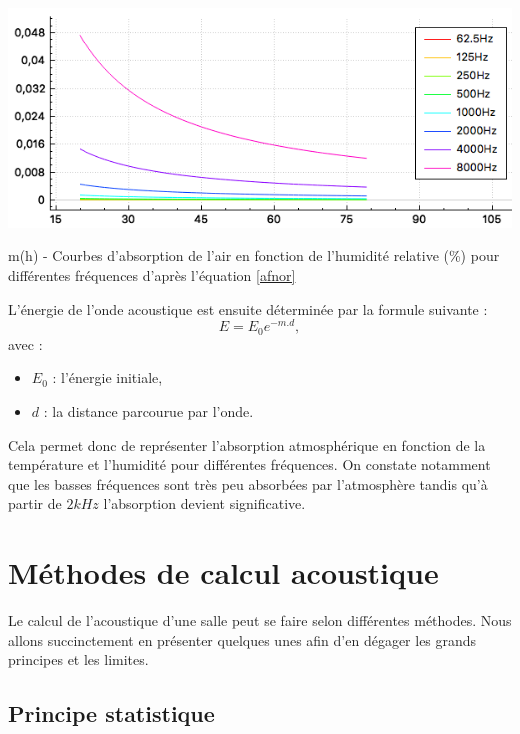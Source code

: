 \begin{figureth}
	\includegraphics[width=0.8\linewidth]{images/absorptionter}
	\caption{m(h) - Courbes d'absorption de l'air en fonction de l'humidité relative (\%) pour différentes fréquences d'après l'équation \ref{afnor}}
	\label{absorptionter}
\end{figureth}

L'énergie de l'onde acoustique est ensuite déterminée par la formule suivante :
\begin{equation} \label{energie_absAir}
	E = E_0 e^{-m.d},
\end{equation}
avec :
\begin{itemize}
\item $E_0$ : l'énergie initiale,
\item $d$ : la distance parcourue par l'onde.
\end{itemize}
Cela permet donc de représenter l'absorption atmosphérique en fonction de la température et l'humidité pour différentes fréquences. On constate notamment que les basses fréquences sont très peu absorbées par l'atmosphère tandis qu'à partir de $2kHz$ l'absorption devient significative.



\section{Méthodes de calcul acoustique} 
Le calcul de l'acoustique d'une salle peut se faire selon différentes méthodes. Nous allons succinctement en présenter quelques unes afin d'en dégager les grands principes et les limites.

	\subsection{Principe statistique} \label{sect_sabine}

